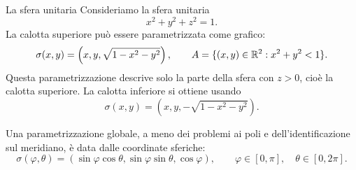 \documentclass[a4paper]{article}
\begin{document}
\begin{radioactive}
\begin{snippetexample}{La sfera unitaria}
    Consideriamo la sfera unitaria
    \[
        x^2+y^2+z^2=1.
    \]
    La calotta superiore può essere parametrizzata come grafico:
    \[
        \sigma(x,y)
        =
        \left(x,y,\sqrt{1-x^2-y^2}\right),
        \qquad
        A=\{(x,y)\in\mathbb{R}^2:x^2+y^2<1\}.
    \]
    Questa parametrizzazione descrive solo la parte della sfera con \(z>0\), cioè la calotta superiore.
    La calotta inferiore si ottiene usando
    \[
        \sigma(x,y)
        =
        \left(x,y,-\sqrt{1-x^2-y^2}\right).
    \]

    Una parametrizzazione globale, a meno dei problemi ai poli e dell'identificazione sul meridiano, è
    data dalle coordinate sferiche:
    \[
        \sigma(\varphi,\theta)
        =
        (\sin\varphi\cos\theta,\sin\varphi\sin\theta,\cos\varphi),
        \qquad
        \varphi\in[0,\pi],
        \quad
        \theta\in[0,2\pi].
    \]



\end{snippetexample}
\end{radioactive}
\end{document}
